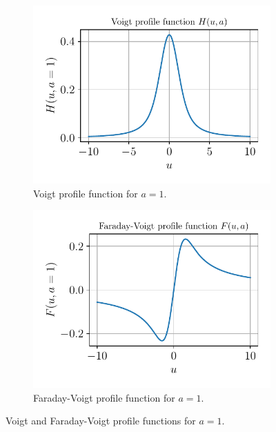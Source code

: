 \documentclass[a4paper,12pt]{report}
\begin{document}
\begin{figure}[h]
\centering
\begin{subfigure}[t]{0.49\textwidth}
    \centering
    \includegraphics[width=\textwidth]{figures/voightprofile.pdf}
    \caption{Voigt profile function for $a=1$.}
    \label{fig:voightprofile}
\end{subfigure}
\hfill
\begin{subfigure}[t]{0.49\textwidth}
    \centering
    \includegraphics[width=\textwidth]{figures/voightfaradayprofile.pdf}
    \caption{Faraday-Voigt profile function for $a=1$.}
    \label{fig:faradayvoightprofile}
\end{subfigure}
\caption{Voigt and Faraday-Voigt profile functions for $a=1$.}
\label{fig:profilefunctions}
\end{figure}
\end{document}
